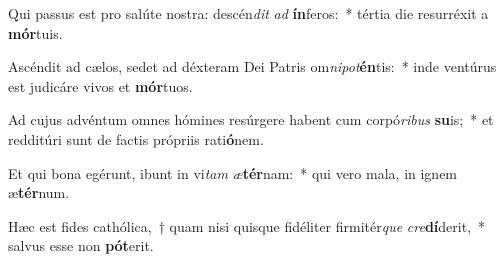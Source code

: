 \item Qui passus est pro salúte nostra: descén\textit{dit} \textit{ad} \textbf{ín}feros:~* tértia die resurréxit a \textbf{mór}tuis.
\item Ascéndit ad cælos, sedet ad déxteram Dei Patris om\textit{ni}\textit{pot}\textbf{én}tis:~* inde ventúrus est judicáre vivos et \textbf{mór}tuos.
\item Ad cujus advéntum omnes hómines resúrgere habent cum corpó\textit{ri}\textit{bus} \textbf{su}is;~* et redditúri sunt de factis própriis rati\textbf{ó}nem.
\item Et qui bona egérunt, ibunt in vi\textit{tam} \textit{æ}\textbf{tér}nam:~* qui vero mala, in ignem æ\textbf{tér}num.
\item Hæc est fides cathólica,~† quam nisi quisque fidéliter firmitér\textit{que} \textit{cre}\textbf{dí}derit,~* salvus esse non \textbf{pót}erit.
